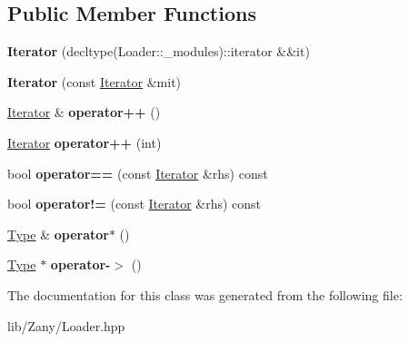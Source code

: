 \subsection*{Public Member Functions}
\begin{DoxyCompactItemize}
\item 
\mbox{\label{classzany_1_1_loader_1_1_iterator_ab297c79dfff39462065b903bb6636343}} 
{\bfseries Iterator} (decltype(Loader\+::\+\_\+modules)\+::iterator \&\&it)
\item 
\mbox{\label{classzany_1_1_loader_1_1_iterator_a69dfce8f6c8098d491eebd5c8e883bc1}} 
{\bfseries Iterator} (const \hyperlink{classzany_1_1_loader_1_1_iterator}{Iterator} \&mit)
\item 
\mbox{\label{classzany_1_1_loader_1_1_iterator_aafd9d72c7d9c93430e7feaff9ccb2d4d}} 
\hyperlink{classzany_1_1_loader_1_1_iterator}{Iterator} \& {\bfseries operator++} ()
\item 
\mbox{\label{classzany_1_1_loader_1_1_iterator_a63a11812a527d2c8c161b1f9ecf35fdf}} 
\hyperlink{classzany_1_1_loader_1_1_iterator}{Iterator} {\bfseries operator++} (int)
\item 
\mbox{\label{classzany_1_1_loader_1_1_iterator_ae5f9686b6f18c796c141d5576e405315}} 
bool {\bfseries operator==} (const \hyperlink{classzany_1_1_loader_1_1_iterator}{Iterator} \&rhs) const
\item 
\mbox{\label{classzany_1_1_loader_1_1_iterator_acc27d09b094cf2db1388ffce9c77b42b}} 
bool {\bfseries operator!=} (const \hyperlink{classzany_1_1_loader_1_1_iterator}{Iterator} \&rhs) const
\item 
\mbox{\label{classzany_1_1_loader_1_1_iterator_a38f3afbb7246c1cfb500b44a3578f559}} 
\hyperlink{classzany_1_1_loader_1_1_abstract_module}{Type} \& {\bfseries operator$\ast$} ()
\item 
\mbox{\label{classzany_1_1_loader_1_1_iterator_a74f924c29e6115a48fd8e86c2fe0a7c8}} 
\hyperlink{classzany_1_1_loader_1_1_abstract_module}{Type} $\ast$ {\bfseries operator-\/$>$} ()
\end{DoxyCompactItemize}


The documentation for this class was generated from the following file\+:\begin{DoxyCompactItemize}
\item 
lib/\+Zany/Loader.\+hpp\end{DoxyCompactItemize}
